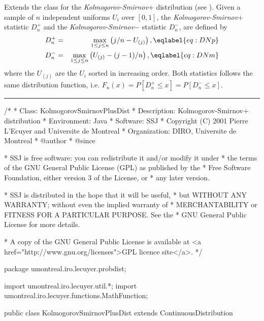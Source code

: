 
\newcommand{\ks}{{\em Kolmogorov-Smirnov\/}}

Extends the class  for the
\ks+{}  distribution (see \cite{tDAR60a,tDUR73a,tBRO07a}).
Given a sample of $n$ independent uniforms $U_i$ over $[0,1]$,
the \ks+{} statistic $D_n^+$ and the \ks$-${} statistic $D_n^-$,
 are defined by
\begin {eqnarray}
  D_n^+ &=& \max_{1\le j\le n} \left(j/n - U_{(j)}\right),
                                                    \eqlabel{eq:DNp} \\
  D_n^- &=& \max_{1\le j\le n} \left(U_{(j)} - (j-1)/n\right),
                                                    \eqlabel{eq:DNm}
\end {eqnarray}
where the $U_{(j)}$ are the $U_i$ sorted in increasing order. Both statistics
follows the same distribution function, i.e.
$F_n(x) = P[D_n^+ \le x] = P[D_n^- \le x]$.


\bigskip\hrule

\begin{code}
\begin{hide}
/*
 * Class:        KolmogorovSmirnovPlusDist
 * Description:  Kolmogorov-Smirnov+ distribution
 * Environment:  Java
 * Software:     SSJ 
 * Copyright (C) 2001  Pierre L'Ecuyer and Universite de Montreal
 * Organization: DIRO, Universite de Montreal
 * @author       
 * @since

 * SSJ is free software: you can redistribute it and/or modify it under
 * the terms of the GNU General Public License (GPL) as published by the
 * Free Software Foundation, either version 3 of the License, or
 * any later version.

 * SSJ is distributed in the hope that it will be useful,
 * but WITHOUT ANY WARRANTY; without even the implied warranty of
 * MERCHANTABILITY or FITNESS FOR A PARTICULAR PURPOSE.  See the
 * GNU General Public License for more details.

 * A copy of the GNU General Public License is available at
   <a href="http://www.gnu.org/licenses">GPL licence site</a>.
 */
\end{hide}
package umontreal.iro.lecuyer.probdist;
\begin{hide}
import umontreal.iro.lecuyer.util.*;
import umontreal.iro.lecuyer.functions.MathFunction;
\end{hide}

public class KolmogorovSmirnovPlusDist extends ContinuousDistribution\begin{hide} {
   protected int n;

   private static class Function implements MathFunction {
      protected int n;
      protected double u;

      public Function (int n, double u) {
         this.n = n;
         this.u = u;
      }

      public double evaluate (double x) {
         return u - cdf(n,x);
      }
   }
\end{hide}
\end{code}
